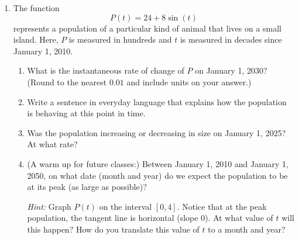 \documentclass[12pt]{exam}
\begin{document}
\begin{enumerate}
\begin{enumerate}
\vfill

\newpage

\item Let $f(\theta)=\theta-2\sin(\theta)$. On the interval $[0,2\pi]$, at which value(s) of $\theta$ does the graph of $f(\theta)$ have a horizontal tangent line?

\vfill

\item Let 
$$g(x)=\tan(x)+x, \qquad 0\leq x\leq 2\pi.$$
At which values of $x$ (between $0$ and $2\pi$) do we have $g'(x)=3$?

\vfill

\end{enumerate}


\newpage


\item The function 
$$P(t)=24+8\sin(t)$$
represents a population of a particular kind of animal that lives on a small island. Here, $P$ is measured in hundreds and $t$ is measured in decades since January 1, 2010. 

	\begin{enumerate}
	
	\item What is the instantaneous rate of change of $P$ on January 1, 2030? (Round to the nearest $0.01$ and include units on your answer.)
	
	\vfill

	\item Write a sentence in everyday language that explains how the population is behaving at this point in time.
	
	\vfill
	
	\item Was the population increasing or decreasing in size on January 1, 2025? At what rate?
	
	\vfill
	
	\item (A warm up for future classes:) Between January 1, 2010 and January 1, 2050, on what date (month and year) do we expect the population to be at its peak (as large as possible)?
	
	\emph{Hint:} Graph $P(t)$ on the interval $[0,4]$. Notice that at the peak population, the tangent line is horizontal (slope 0). At what value of $t$ will this happen? How do you translate this value of $t$ to a month and year?
	
	\vfill
	
	\end{enumerate}



\end{enumerate}



\end{document}
